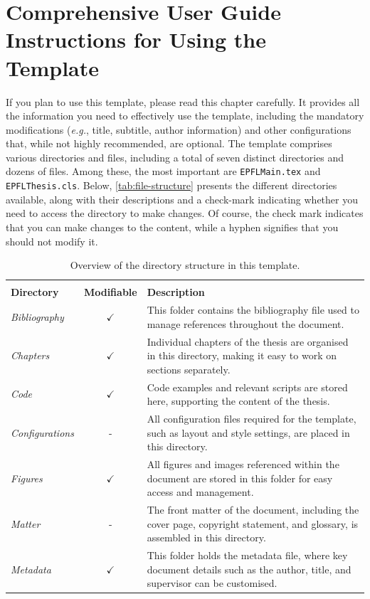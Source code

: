 \chapter[Comprehensive User Guide: Instructions for Using the Template]{Comprehensive User Guide Instructions for Using the Template}
\label{cp:user-guide}

If you plan to use this template, please read this chapter carefully. It provides all the information you need to effectively use the template, including the mandatory modifications (\textit{e.g.}, title, subtitle, author information) and other configurations that, while not highly recommended, are optional. The template comprises various directories and files, including a total of seven distinct directories and dozens of files. Among these, the most important are \texttt{EPFLMain.tex} and \texttt{EPFLThesis.cls}. Below, \autoref{tab:file-structure} presents the different directories available, along with their descriptions and a check-mark indicating whether you need to access the directory to make changes. Of course, the check mark indicates that you can make changes to the content, while a hyphen signifies that you should not modify it.

\begin{table}[!htpb]
    \setlength{\extrarowheight}{2pt}
    \caption[Directory structure and file organisation]{Overview of the directory structure in this template.}
    \label{tab:file-structure}
    \begin{tabularx}{\textwidth}{lcX}
        \toprule
        \\[-1.5\normalbaselineskip]
        \textbf{Directory} & \textbf{Modifiable} & \textbf{Description} \\ [0em]
        \midrule
        \textit{Bibliography} & $\checkmark$ & This folder contains the bibliography file used to manage references throughout the document. \\
        \textit{Chapters} & $\checkmark$ & Individual chapters of the thesis are organised in this directory, making it easy to work on sections separately. \\
        \textit{Code} & $\checkmark$ & Code examples and relevant scripts are stored here, supporting the content of the thesis. \\
        \textit{Configurations} & - & All configuration files required for the template, such as layout and style settings, are placed in this directory. \\
        \textit{Figures} & $\checkmark$ & All figures and images referenced within the document are stored in this folder for easy access and management. \\
        \textit{Matter} & - & The front matter of the document, including the cover page, copyright statement, and glossary, is assembled in this directory. \\
        \textit{Metadata} & $\checkmark$ & This folder holds the metadata file, where key document details such as the author, title, and supervisor can be customised. \\
        \bottomrule
    \end{tabularx}
\end{table}

